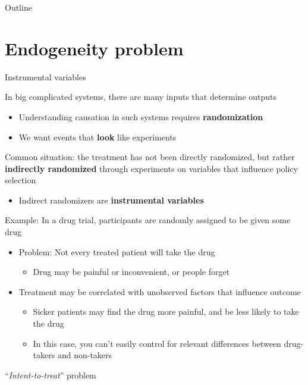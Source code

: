 \documentclass[compress, 8pt]{beamer}
\begin{document}
\miniframesoff
\begin{frame}{Outline}
    \tableofcontents
\end{frame}
\miniframeson

\section[Endogeneity]{Endogeneity problem}
\miniframesoff
\begin{frame}
    \tableofcontents[currentsection]
\end{frame}
\miniframeson

\begin{frame}{Instrumental variables}

In big complicated systems, there are many inputs that determine outputs
\begin{itemize}
    \item Understanding causation in such systems requires \textbf{randomization}
    \item [$\implies$] We want events that \textbf{look} like experiments
\end{itemize}

\vspace{3ex}
Common situation: the treatment has not been directly randomized, but rather \textbf{indirectly randomized} through experiments on variables that influence policy selection
\begin{itemize}
    \item Indirect randomizers are \textbf{instrumental variables}
\end{itemize}

\vspace{3ex}
Example: In a drug trial, participants are randomly assigned to be given some drug
\begin{itemize}
    \item Problem: Not every treated patient will take the drug
    \begin{itemize}
        \item Drug may be painful or inconvenient, or people forget
    \end{itemize}
    \item Treatment may be correlated with unobserved factors that influence outcome
    \begin{itemize}
        \item Sicker patients may find the drug more painful, and be less likely to take the drug
        \item In this case, you can't easily control for relevant differences between drug-takers and non-takers
    \end{itemize}
\end{itemize}
``\emph{Intent-to-treat}'' problem

\end{frame}
\end{document}
